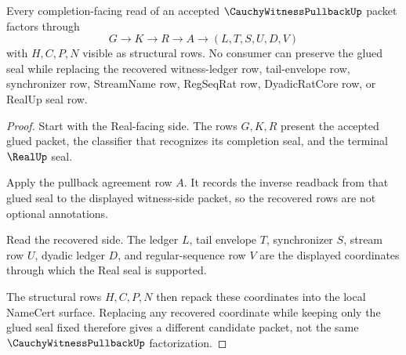 \begin{theorem}
\label{thm:cauchy-witness-pullback-real-seal-factorization}
Every completion-facing read of an accepted $\CauchyWitnessPullbackUp$ packet factors through
$$
G \to K \to R \to A \to (L,T,S,U,D,V)
$$
with $H,C,P,N$ visible as structural rows. No consumer can preserve the glued seal while replacing the recovered witness-ledger row, tail-envelope row, synchronizer row, StreamName row, RegSeqRat row, DyadicRatCore row, or RealUp seal row.
\end{theorem}
\begin{proof}
Start with the Real-facing side. The rows $G,K,R$ present the accepted glued packet, the classifier that recognizes its completion seal, and the terminal $\RealUp$ seal.

Apply the pullback agreement row $A$. It records the inverse readback from that glued seal to the displayed witness-side packet, so the recovered rows are not optional annotations.

Read the recovered side. The ledger $L$, tail envelope $T$, synchronizer $S$, stream row $U$, dyadic ledger $D$, and regular-sequence row $V$ are the displayed coordinates through which the Real seal is supported.

The structural rows $H,C,P,N$ then repack these coordinates into the local NameCert surface. Replacing any recovered coordinate while keeping only the glued seal fixed therefore gives a different candidate packet, not the same $\CauchyWitnessPullbackUp$ factorization.
\end{proof}

